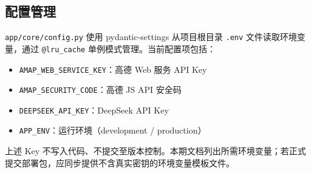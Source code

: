 \subsection{配置管理}

\texttt{app/core/config.py} 使用 pydantic-settings 从项目根目录 \texttt{.env} 文件读取环境变量，通过 \texttt{@lru\_cache} 单例模式管理。当前配置项包括：

\begin{itemize}
  \item \texttt{AMAP\_WEB\_SERVICE\_KEY}：高德 Web 服务 API Key
  \item \texttt{AMAP\_SECURITY\_CODE}：高德 JS API 安全码
  \item \texttt{DEEPSEEK\_API\_KEY}：DeepSeek API Key
  \item \texttt{APP\_ENV}：运行环境（development / production）
\end{itemize}

上述 Key 不写入代码、不提交至版本控制。本期文档列出所需环境变量；若正式提交部署包，应同步提供不含真实密钥的环境变量模板文件。
